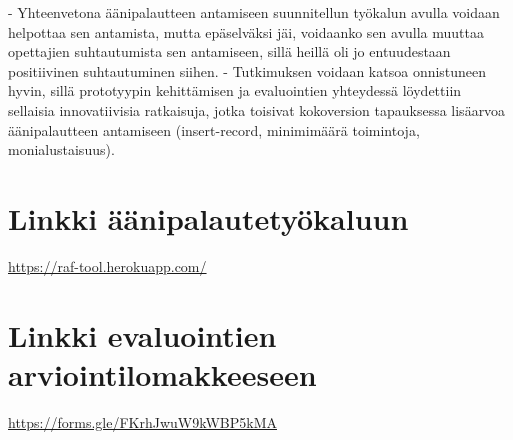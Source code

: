 \documentclass[utf8]{gradu3}
\begin{document}
- Yhteenvetona äänipalautteen antamiseen suunnitellun työkalun avulla voidaan helpottaa sen antamista, mutta epäselväksi jäi, voidaanko sen avulla muuttaa opettajien suhtautumista sen antamiseen, sillä heillä oli jo entuudestaan positiivinen suhtautuminen siihen.
- Tutkimuksen voidaan katsoa onnistuneen hyvin, sillä prototyypin kehittämisen ja evaluointien yhteydessä löydettiin sellaisia innovatiivisia ratkaisuja, jotka toisivat kokoversion tapauksessa lisäarvoa äänipalautteen antamiseen (insert-record, minimimäärä toimintoja, monialustaisuus).

%

\printbibliography

\appendix

\section{Linkki äänipalautetyökaluun}

\url{https://raf-tool.herokuapp.com/}

\section{Linkki evaluointien arviointilomakkeeseen}

\url{https://forms.gle/FKrhJwuW9kWBP5kMA}
\end{document}
